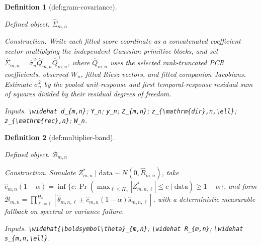 \documentclass{article}
\newtheorem{definition}{Definition}
\begin{document}
\begin{definition}[def:gram-covariance]\label{def:gram-covariance}
\par\smallskip\noindent\emph{Defined object.} \(\widehat\Sigma_{m,n}\)
\par\smallskip\noindent\emph{Construction.} Write each fitted score coordinate as a concatenated coefficient vector multiplying the independent Gaussian primitive blocks, and set \(\widehat\Sigma_{m,n}=\widehat\sigma_n^2\widehat Q_{m,n}\widehat Q_{m,n}^{\top}\), where \(\widehat Q_{m,n}\) uses the selected rank-truncated PCR coefficients, observed \(W_n\), fitted Riesz vectors, and fitted companion Jacobians. Estimate \(\sigma_n^2\) by the pooled unit-response and first temporal-response residual sum of squares divided by their residual degrees of freedom.
\par\smallskip\noindent\emph{Inputs.} \texttt{\textbackslash{}\allowbreak{}widehat d\_\allowbreak{}\{m,\allowbreak{}n\}\allowbreak{}}; \texttt{Y\_\allowbreak{}n}; \texttt{y\_\allowbreak{}n}; \texttt{Z\_\allowbreak{}\{m,\allowbreak{}n\}\allowbreak{}}; \texttt{z\_\allowbreak{}\{\textbackslash{}\allowbreak{}mathrm\{dir\}\allowbreak{},\allowbreak{}n,\allowbreak{}\textbackslash{}\allowbreak{}ell\}\allowbreak{}}; \texttt{z\_\allowbreak{}\{\textbackslash{}\allowbreak{}mathrm\{rec\}\allowbreak{},\allowbreak{}n\}\allowbreak{}}; \texttt{W\_\allowbreak{}n}.
\end{definition}

\begin{definition}[def:multiplier-band]\label{def:multiplier-band}
\par\smallskip\noindent\emph{Defined object.} \(\mathcal B_{m,n}\)
\par\smallskip\noindent\emph{Construction.} Simulate \(Z^{\ast}_{m,n}\mid\mathrm{data}\sim N(0,\widehat R_{m,n})\), take \(\widehat c_{m,n}(1-\alpha)=\inf\{c:\Pr(\max_{\ell\le H_n}|Z^{\ast}_{m,n,\ell}|\le c\mid\mathrm{data})\ge1-\alpha\}\), and form \(\mathcal B_{m,n}=\prod_{\ell=1}^{H_n}[\widehat\theta_{m,n,\ell}\pm\widehat c_{m,n}(1-\alpha)\widehat s_{m,n,\ell}]\), with a deterministic measurable fallback on spectral or variance failure.
\par\smallskip\noindent\emph{Inputs.} \texttt{\textbackslash{}\allowbreak{}widehat\{\textbackslash{}\allowbreak{}boldsymbol\textbackslash{}\allowbreak{}theta\}\allowbreak{}\_\allowbreak{}\{m,\allowbreak{}n\}\allowbreak{}}; \texttt{\textbackslash{}\allowbreak{}widehat R\_\allowbreak{}\{m,\allowbreak{}n\}\allowbreak{}}; \texttt{\textbackslash{}\allowbreak{}widehat s\_\allowbreak{}\{m,\allowbreak{}n,\allowbreak{}\textbackslash{}\allowbreak{}ell\}\allowbreak{}}.
\end{definition}
\end{document}
